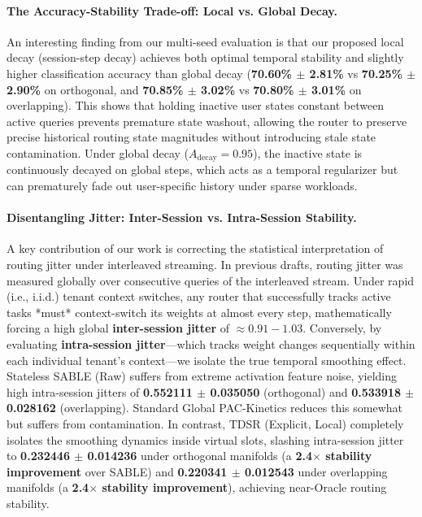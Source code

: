 \paragraph{The Accuracy-Stability Trade-off: Local vs. Global Decay.}
An interesting finding from our multi-seed evaluation is that our proposed local decay (session-step decay) achieves both optimal temporal stability and slightly higher classification accuracy than global decay (\textbf{70.60\% $\pm$ 2.81\%} vs \textbf{70.25\% $\pm$ 2.90\%} on orthogonal, and \textbf{70.85\% $\pm$ 3.02\%} vs \textbf{70.80\% $\pm$ 3.01\%} on overlapping). This shows that holding inactive user states constant between active queries prevents premature state washout, allowing the router to preserve precise historical routing state magnitudes without introducing stale state contamination. Under global decay ($A_{\text{decay}} = 0.95$), the inactive state is continuously decayed on global steps, which acts as a temporal regularizer but can prematurely fade out user-specific history under sparse workloads.

\paragraph{Disentangling Jitter: Inter-Session vs. Intra-Session Stability.}
A key contribution of our work is correcting the statistical interpretation of routing jitter under interleaved streaming. In previous drafts, routing jitter was measured globally over consecutive queries of the interleaved stream. Under rapid (i.e., i.i.d.) tenant context switches, any router that successfully tracks active tasks *must* context-switch its weights at almost every step, mathematically forcing a high global \textbf{inter-session jitter} of $\approx 0.91 - 1.03$.
Conversely, by evaluating \textbf{intra-session jitter}—which tracks weight changes sequentially within each individual tenant's context—we isolate the true temporal smoothing effect. Stateless SABLE (Raw) suffers from extreme activation feature noise, yielding high intra-session jitters of \textbf{0.552111 $\pm$ 0.035050} (orthogonal) and \textbf{0.533918 $\pm$ 0.028162} (overlapping). Standard Global PAC-Kinetics reduces this somewhat but suffers from contamination. In contrast, TDSR (Explicit, Local) completely isolates the smoothing dynamics inside virtual slots, slashing intra-session jitter to \textbf{0.232446 $\pm$ 0.014236} under orthogonal manifolds (a \textbf{2.4$\times$ stability improvement} over SABLE) and \textbf{0.220341 $\pm$ 0.012543} under overlapping manifolds (a \textbf{2.4$\times$ stability improvement}), achieving near-Oracle routing stability.

